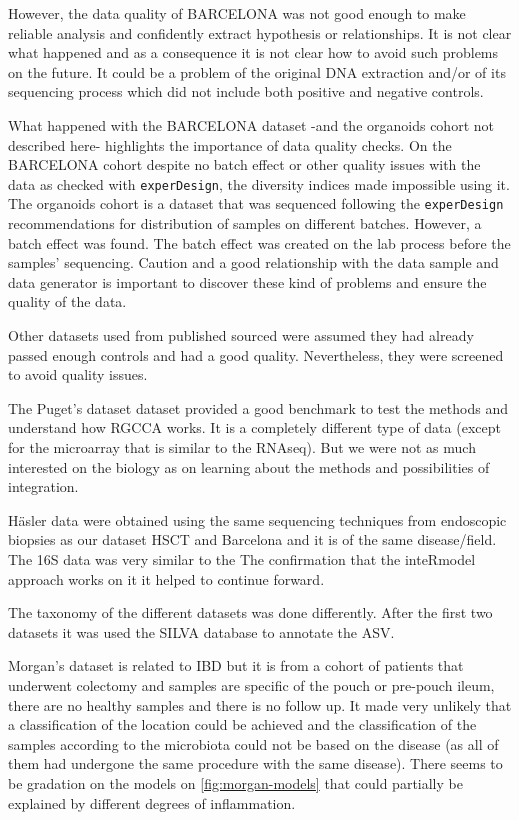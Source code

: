 \documentclass[
  a4paper,
]{book}
\begin{document}
However, the data quality of BARCELONA was not good enough to make reliable analysis and confidently extract hypothesis or relationships.
It is not clear what happened and as a consequence it is not clear how to avoid such problems on the future.
It could be a problem of the original DNA extraction and/or of its sequencing process which did not include both positive and negative controls.

What happened with the BARCELONA dataset -and the organoids cohort not described here- highlights the importance of data quality checks.
On the BARCELONA cohort despite no batch effect or other quality issues with the data as checked with \texttt{experDesign}, the diversity indices made impossible using it.
The organoids cohort is a dataset that was sequenced following the \texttt{experDesign} recommendations for distribution of samples on different batches.
However, a batch effect was found.
The batch effect was created on the lab process before the samples' sequencing.
Caution and a good relationship with the data sample and data generator is important to discover these kind of problems and ensure the quality of the data.

Other datasets used from published sourced were assumed they had already passed enough controls and had a good quality.
Nevertheless, they were screened to avoid quality issues.

The Puget's dataset dataset provided a good benchmark to test the methods and understand how RGCCA works.
It is a completely different type of data (except for the microarray that is similar to the RNAseq).
But we were not as much interested on the biology as on learning about the methods and possibilities of integration.

Häsler data were obtained using the same sequencing techniques from endoscopic biopsies as our dataset HSCT and Barcelona and it is of the same disease/field.
The 16S data was very similar to the The confirmation that the inteRmodel approach works on it it helped to continue forward.

The taxonomy of the different datasets was done differently.
After the first two datasets it was used the SILVA database to annotate the ASV.

Morgan's dataset is related to IBD but it is from a cohort of patients that underwent colectomy and samples are specific of the pouch or pre-pouch ileum, there are no healthy samples and there is no follow up.
It made very unlikely that a classification of the location could be achieved and the classification of the samples according to the microbiota could not be based on the disease (as all of them had undergone the same procedure with the same disease).
There seems to be gradation on the models on \ref{fig:morgan-models} that could partially be explained by different degrees of inflammation.
\end{document}
